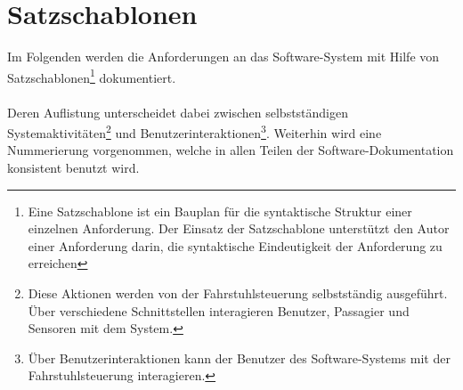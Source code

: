 \newpage
\section{Satzschablonen}
Im Folgenden werden die Anforderungen an das Software-System mit Hilfe von Satzschablonen\footnote{Eine Satzschablone ist ein Bauplan für die syntaktische Struktur einer einzelnen Anforderung. Der Einsatz der Satzschablone unterstützt den Autor einer Anforderung darin, die syntaktische Eindeutigkeit der Anforderung zu erreichen} dokumentiert.

\paragraph{}
Deren Auflistung unterscheidet dabei zwischen selbstständigen Systemaktivitäten\footnote{Diese Aktionen werden von der \gls{Fahrstuhlsteuerung} selbstständig ausgeführt. Über verschiedene Schnittstellen interagieren Benutzer, Passagier und Sensoren mit dem System.} und Benutzerinteraktionen\footnote{Über Benutzerinteraktionen kann der Benutzer des Software-Systems mit der \gls{Fahrstuhlsteuerung} interagieren.}. Weiterhin wird eine Nummerierung vorgenommen, welche in allen Teilen der Software-Dokumentation konsistent benutzt wird.

